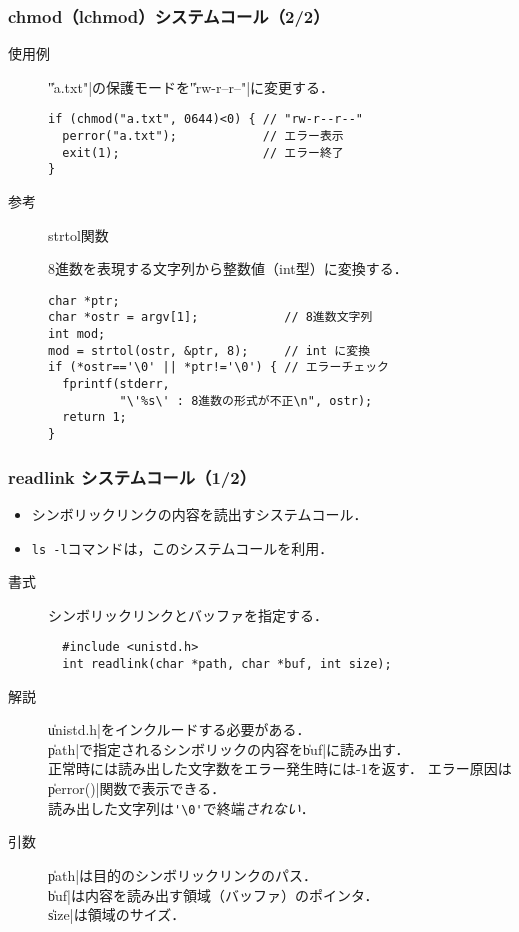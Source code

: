 \documentclass{beamer}                 %
\begin{document}
\begin{frame}[fragile]
  \frametitle{chmod（lchmod）システムコール（2/2）}
  \begin{description}
  \item[使用例] \|"a.txt"|の保護モードを\|"rw-r--r--"|に変更する．
\begin{verbatim}
if (chmod("a.txt", 0644)<0) { // "rw-r--r--"
  perror("a.txt");            // エラー表示
  exit(1);                    // エラー終了
}
\end{verbatim}

  \item[参考] strtol関数

    8進数を表現する文字列から整数値（int型）に変換する．
\begin{verbatim}
char *ptr;
char *ostr = argv[1];            // 8進数文字列
int mod;
mod = strtol(ostr, &ptr, 8);     // int に変換
if (*ostr=='\0' || *ptr!='\0') { // エラーチェック
  fprintf(stderr, 
          "\'%s\' : 8進数の形式が不正\n", ostr);
  return 1;
}
\end{verbatim}

\end{description}
\end{frame}

\begin{frame}[fragile]
  \frametitle{readlink システムコール（1/2）}
  \begin{itemize}
  \item シンボリックリンクの内容を読出すシステムコール．
  \item \texttt{ls -l}コマンドは，このシステムコールを利用．
  \end{itemize}

  \begin{description}
  \item[書式] シンボリックリンクとバッファを指定する．
\begin{verbatim}
  #include <unistd.h>
  int readlink(char *path, char *buf, int size);
\end{verbatim}

  \item[解説] \|unistd.h|をインクルードする必要がある．\\
    \|path|で指定されるシンボリックの内容を\|buf|に読み出す．\\
    正常時には読み出した文字数をエラー発生時には-1を返す．
    エラー原因は\|perror()|関数で表示できる．\\
    読み出した文字列は\verb;'\0';で終端\emph{されない}．

  \item[引数] \|path|は目的のシンボリックリンクのパス．\\
    \|buf|は内容を読み出す領域（バッファ）のポインタ．\\
    \|size|は領域のサイズ．

  \end{description}
\end{frame}
\end{document}
